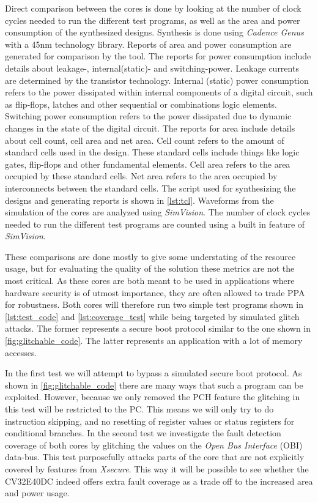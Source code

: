 Direct comparison between the cores is done by looking at the number of clock cycles needed to run the different test programs, as well as the area and power consumption of the synthesized designs. Synthesis is done using \textit{Cadence Genus} with a 45nm technology library. Reports of area and power consumption are generated for comparison by the tool. The reports for power consumption include details about leakage-, internal(static)- and switching-power. Leakage currents are determined by the transistor technology. Internal (static) power consumption refers to the power dissipated within internal components of a digital circuit, such as flip-flops, latches and other sequential or combinations logic elements. Switching power consumption refers to the power dissipated due to dynamic changes in the state of the digital circuit. The reports for area include details about cell count, cell area and net area. Cell count refers to the amount of standard cells used in the design. These standard cells include things like logic gates, flip-flops and other fundamental elements. Cell area refers to the area occupied by these standard cells. Net area refers to the area occupied by interconnects between the standard cells. The script used for synthesizing the designs and generating reports is shown in \autoref{lst:tcl}. Waveforms from the simulation of the cores are analyzed using \textit{SimVision}. The number of clock cycles needed to run the different test programs are counted using a built in feature of \textit{SimVision}. 

These comparisons are done mostly to give some understating of the resource usage, but for evaluating the quality of the solution these metrics are not the most critical. As these cores are both meant to be used in applications where hardware security is of utmost importance, they are often allowed to trade PPA for robustness. Both cores will therefore run two simple test programs shown in \autoref{lst:test_code} and \autoref{lst:coverage_test} while being targeted by simulated glitch attacks. The former represents a secure boot protocol similar to the one shown in \autoref{fig:glitchable_code}. The latter represents an application with a lot of memory accesses. 

In the first test we will attempt to bypass a simulated secure boot protocol. As shown in \autoref{fig:glitchable_code} there are many ways that such a program can be exploited. However, because we only removed the PCH feature the glitching in this test will be restricted to the PC. This means we will only try to do instruction skipping, and no resetting of register values or status registers for conditional branches. In the second test we investigate the fault detection coverage of both cores by glitching the values on the \textit{Open Bus Interface} (OBI) data-bus. This test purposefully attacks parts of the core that are not explicitly covered by features from \textit{Xsecure}. This way it will be possible to see whether the CV32E40DC indeed offers extra fault coverage as a trade off to the increased area and power usage. 

